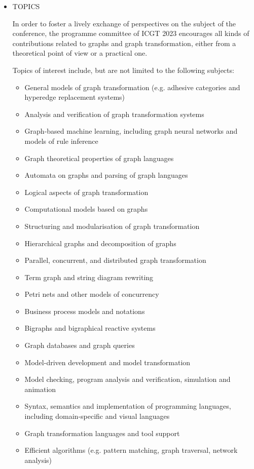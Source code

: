 \documentclass[prodmode,acmtecs]{acmsmall} %
\begin{document}
\begin{itemize}
\item  TOPICS   
 
  In order to foster a lively exchange of perspectives on the subject of the conference, the programme committee of ICGT 2023 encourages all kinds of contributions related to graphs and graph transformation, either from a theoretical point of view or a practical one. 
 
 Topics of interest include, but are not limited to the following subjects: 
 
\begin{itemize}\item  General models of graph transformation (e.g. adhesive categories and hyperedge replacement systems)
\item  Analysis and verification of graph transformation systems
\item  Graph-based machine learning, including graph neural networks and models of rule inference
\item  Graph theoretical properties of graph languages
\item  Automata on graphs and parsing of graph languages
\item  Logical aspects of graph transformation
\item  Computational models based on graphs
\item  Structuring and modularisation of graph transformation
\item  Hierarchical graphs and decomposition of graphs
\item  Parallel, concurrent, and distributed graph transformation
\item  Term graph and string diagram rewriting
\item  Petri nets and other models of concurrency
\item  Business process models and notations
\item  Bigraphs and bigraphical reactive systems
\item  Graph databases and graph queries
\item  Model-driven development and model transformation
\item  Model checking, program analysis and verification, simulation and animation
\item  Syntax, semantics and implementation of programming languages, including domain-specific and visual languages
\item  Graph transformation languages and tool support
\item  Efficient algorithms (e.g. pattern matching, graph traversal, network analysis)

\end{itemize}
\end{itemize}
\end{document}
